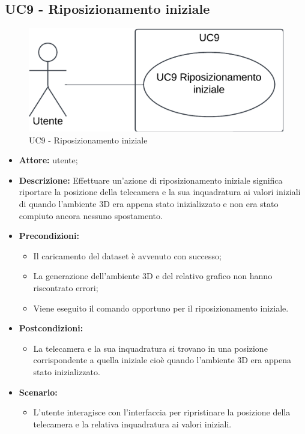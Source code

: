 \subsection{UC9 - Riposizionamento iniziale}
\begin{figure}[h!]\centering
    \includegraphics[scale=0.7]{template/images/UC9.png}
    \caption{UC9 - Riposizionamento iniziale}
\end{figure}
\begin{itemize}    
    \item \textbf{Attore:} utente;
    \item \textbf{Descrizione:} Effettuare un'azione di riposizionamento iniziale significa riportare la posizione della telecamera e la sua inquadratura ai valori iniziali di quando l'ambiente 3D 
    era appena stato inizializzato e non era stato compiuto ancora nessuno spostamento.
    \item \textbf{Precondizioni:}    
        \begin{itemize}
            \item Il caricamento del dataset è avvenuto con successo;
            \item La generazione dell'ambiente 3D e del relativo grafico non hanno riscontrato errori;
            \item Viene eseguito il comando opportuno per il riposizionamento iniziale.
        \end{itemize}    
    \item \textbf{Postcondizioni:}
        \begin{itemize}
            \item La telecamera e la sua inquadratura si trovano in una posizione corrispondente a quella iniziale cioè quando l'ambiente 3D era appena stato inizializzato.
        \end{itemize}    
    \item \textbf{Scenario:} 
        \begin{itemize}
            \item L'utente interagisce con l'interfaccia per ripristinare la posizione della telecamera e la relativa inquadratura ai valori iniziali.
        \end{itemize}
\end{itemize}

